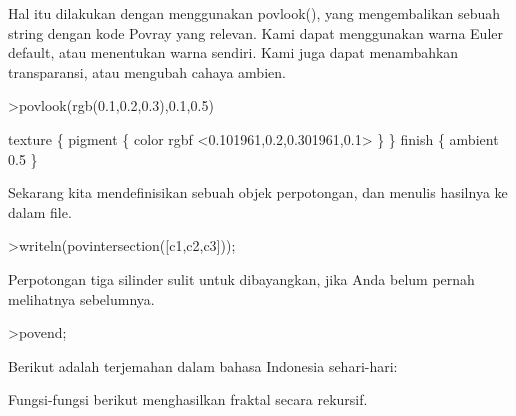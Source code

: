\begin{eulercomment}
\begin{eulercomment}
Hal itu dilakukan dengan menggunakan povlook(), yang mengembalikan
sebuah string dengan kode Povray yang relevan. Kami dapat menggunakan
warna Euler default, atau menentukan warna sendiri. Kami juga dapat
menambahkan transparansi, atau mengubah cahaya ambien.
\end{eulercomment}
\begin{eulerprompt}
>povlook(rgb(0.1,0.2,0.3),0.1,0.5)
\end{eulerprompt}
\begin{euleroutput}
   texture \{ pigment \{ color rgbf <0.101961,0.2,0.301961,0.1> \}  \} 
   finish \{ ambient 0.5 \} 
  
\end{euleroutput}
\begin{eulercomment}
Sekarang kita mendefinisikan sebuah objek perpotongan, dan menulis
hasilnya ke dalam file.
\end{eulercomment}
\begin{eulerprompt}
>writeln(povintersection([c1,c2,c3]));
\end{eulerprompt}
\begin{eulercomment}
Perpotongan tiga silinder sulit untuk dibayangkan, jika Anda belum
pernah melihatnya sebelumnya.
\end{eulercomment}
\begin{eulerprompt}
>povend;
\end{eulerprompt}
\begin{eulercomment}
Berikut adalah terjemahan dalam bahasa Indonesia sehari-hari:

Fungsi-fungsi berikut menghasilkan fraktal secara rekursif.


\end{eulercomment}
\end{eulercomment}
